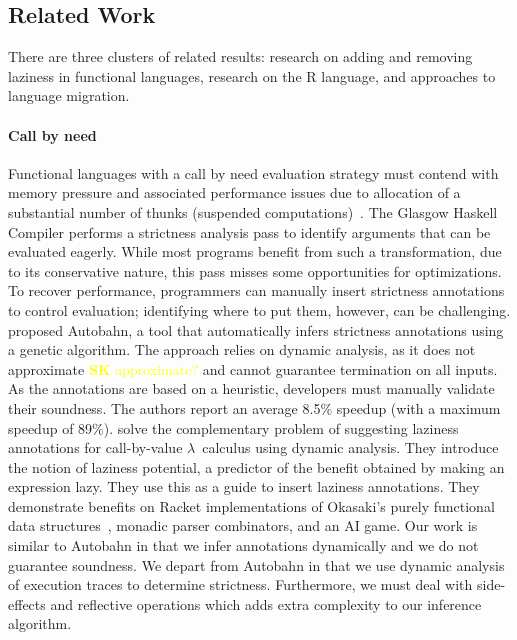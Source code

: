 \documentclass[review,creen,acmsmall]{acmart}
\newcommand{\authorcomment}[3]{\xspace\textcolor{#1}{{\bf #2} #3}\xspace}
\newcommand{\SK}[1]{\authorcomment{yellow}{SK}{#1}}
\begin{document}
\subsection{Related Work}

There are three clusters of related results: research on adding and removing
laziness in functional languages, research on the R language, and approaches to
language migration.

\paragraph{Call by need}  Functional languages with
a call by need evaluation strategy must contend with memory pressure and
associated performance issues due to allocation of a substantial number of
thunks (suspended computations)~\cite{transformopt,stricteffective,opteval}. The
Glasgow Haskell Compiler performs a strictness analysis pass to identify
arguments that can be evaluated eagerly. While most programs benefit from such a
transformation, due to its conservative nature, this pass misses some
opportunities for optimizations. To recover performance, programmers can manually
insert strictness annotations to control evaluation; identifying where to put
them, however, can be challenging. \citet{autobahn} proposed Autobahn, a tool
that automatically infers strictness annotations using a genetic algorithm. The
approach relies on dynamic analysis, as it does not approximate \SK{approximate?} and cannot
guarantee termination on all inputs. As the annotations are based on a
heuristic, developers must manually validate their soundness. The authors report
an average 8.5\% speedup (with a maximum speedup of 89\%). \citet{lazyprof}
solve the complementary problem of suggesting laziness annotations for
call-by-value $\lambda$~calculus using dynamic analysis. They introduce the
notion of laziness potential, a predictor of the benefit obtained by making an
expression lazy. They use this as a guide to insert laziness annotations. They
demonstrate benefits on Racket implementations of Okasaki's purely functional
data structures~\cite{oka95}, monadic parser combinators, and an AI game. Our
work is similar to Autobahn in that we infer annotations dynamically and we do
not guarantee soundness. We depart from Autobahn in that we use dynamic analysis
of execution traces to determine strictness. Furthermore, we must deal with
side-effects and reflective operations which adds extra complexity to our
inference algorithm.
\end{document}
